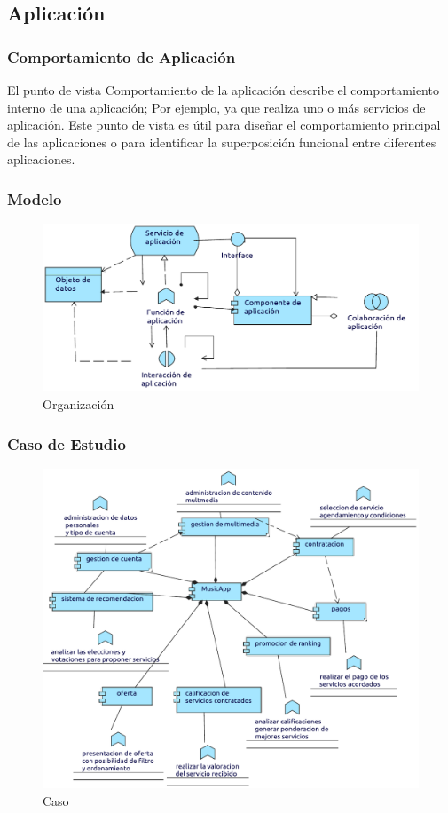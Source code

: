 \subsection{Aplicación}

\subsubsection{Comportamiento de Aplicación}
El punto de vista Comportamiento de la aplicación describe el comportamiento interno de una aplicación; Por ejemplo, ya que realiza uno o más servicios de aplicación. Este punto de vista es útil para diseñar el comportamiento principal de las aplicaciones o para identificar la superposición funcional entre diferentes aplicaciones.
\subsubsection{Modelo}
\begin{figure}[h!]
	\centering
	\includegraphics[width=\linewidth]{Desarrollo/ArquitecturaEmpresarial/Aplicacion/imgs/ComportamientoMetamodelo.pdf}
	\caption{Organización}
\end{figure}
\newpage
\subsubsection{Caso de Estudio}

\begin{figure}[h!]
	\centering
	\includegraphics[width=\linewidth]{Desarrollo/ArquitecturaEmpresarial/Aplicacion/imgs/Comportamiento.pdf}
	\caption{Caso}
\end{figure}

